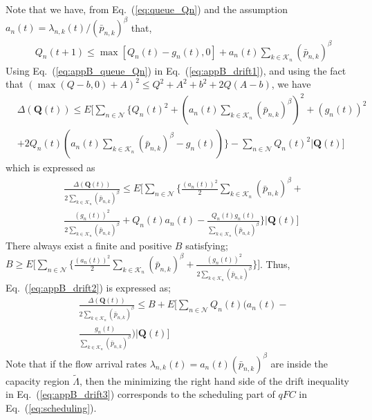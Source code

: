 \documentclass[conference]{IEEEtran}
\newcommand{\Kset}{\mathcal{K}}
\newcommand{\Nset}{\mathcal{N}}
\begin{document}
Note that we have, from Eq.~(\ref{eq:queue_Qn}) and the assumption $a_{n}(t) = \lambda_{n,k}(t)/(\bar{p}_{n,k})^{\beta}$ that,
\begin{align} \label{eq:appB_queue_Qn}
& Q_{n}(t+1) \leq \max [Q_{n}(t) - g_{n}(t), 0] + a_{n}(t) \sum_{k \in \Kset_{n}}(\bar{p}_{n,k})^{\beta}
\end{align} Using Eq.~(\ref{eq:appB_queue_Qn}) in Eq.~(\ref{eq:appB_drift1}), and using the fact that $(\max(Q-b,0)+A)^2 \leq Q^2 + A^2 + b^2 + 2Q(A-b)$, we have 
\begin{align}
& \Delta(\boldsymbol Q(t)) \leq E \bigl[ \sum_{n \in \Nset} \bigl\{ Q_{n}(t)^{2} + (a_{n}(t) \sum_{k \in \Kset_{n}} (\bar{p}_{n,k})^{\beta})^{2} + (g_{n}(t))^{2} \nonumber \\
& + 2Q_{n}(t) (a_n(t) \sum_{k \in \Kset_{n}} (\bar{p}_{n,k})^{\beta} - g_{n}(t) )  \bigr\}  - \sum_{n \in \Nset} Q_{n}(t)^{2} | \boldsymbol Q(t) \bigr]
\end{align} which is expressed as
\begin{align} \label{eq:appB_drift2}
& \frac{\Delta(\boldsymbol Q(t))}{2\sum_{k \in \Kset_{n}} (\bar{p}_{n,k})^{\beta} } \leq E \bigl[ \sum_{n \in \Nset} \bigl \{ \frac{(a_{n}(t))^{2}}{2} \sum_{k \in \Kset_{n}} (\bar{p}_{n,k})^{\beta} + \nonumber \\
& \frac{(g_{n}(t))^{2}}{2\sum_{k \in \Kset_{n}} (\bar{p}_{n,k})^{\beta}}  + Q_{n}(t) a_{n}(t) - \frac{Q_{n}(t) g_{n}(t)}{\sum_{k \in \Kset_{n}} (\bar{p}_{n,k})^{\beta} }  \bigr \} | \boldsymbol Q(t) \bigr]
\end{align} There always exist a finite and positive $B$ satisfying; $ B \geq E \bigl[ \sum_{n \in \Nset} \bigl \{ \frac{(a_{n}(t))^{2}}{2} \sum_{k \in \Kset_{n}} (\bar{p}_{n,k})^{\beta} + \frac{(g_{n}(t))^{2}}{2\sum_{k \in \Kset_{n}} (\bar{p}_{n,k})^{\beta}} \bigr \} \bigr ]$. Thus, Eq.~(\ref{eq:appB_drift2}) is expressed as; 
\begin{align} \label{eq:appB_drift3}
& \frac{\Delta(\boldsymbol Q(t))}{2\sum_{k \in \Kset_{n}} (\bar{p}_{n,k})^{\beta} } \leq B + E \bigl[ \sum_{n \in \Nset} Q_{n}(t) \bigl(a_{n}(t) - \nonumber \\
& \frac{g_{n}(t)}{\sum_{k \in \Kset_{n}} (\bar{p}_{n,k})^{\beta} } \bigr) | \boldsymbol Q(t)\bigr]
\end{align} Note that if the flow arrival rates $\lambda_{n,k}(t) = a_{n}(t) (\bar{p}_{n,k})^{\beta}$ are inside the capacity region $\tilde{\Lambda}$, then the minimizing the right hand side of the drift inequality in Eq.~(\ref{eq:appB_drift3}) corresponds to the scheduling part of $qFC$ in Eq.~(\ref{eq:scheduling}). 
\end{document}
